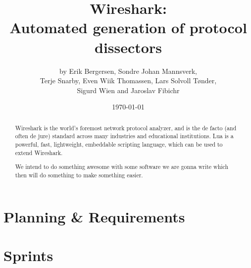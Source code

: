 \documentclass[a4paper, 11pt]{report}
\title{Wireshark:\\ Automated generation of protocol dissectors}
\author{by Erik Bergersen, Sondre Johan Mannsverk,\\ Terje Snarby,
		Even Wiik Thomassen, Lars Solvoll Tønder,\\ Sigurd Wien
		and Jaroslav Fibichr}
\date{\today}
\begin{document}
\maketitle

\begin{abstract}
Wireshark is the world's foremost network protocol analyzer, and is the de
facto (and often de jure) standard across many industries and educational
institutions. Lua is a powerful, fast, lightweight, embeddable scripting
language, which can be used to extend Wireshark.

We intend to do something awesome with some software we are gonna write
which then will do something to make something easier.
\end{abstract}

\tableofcontents

\part{Planning \& Requirements}



%

\part{Sprints}


\end{document}
